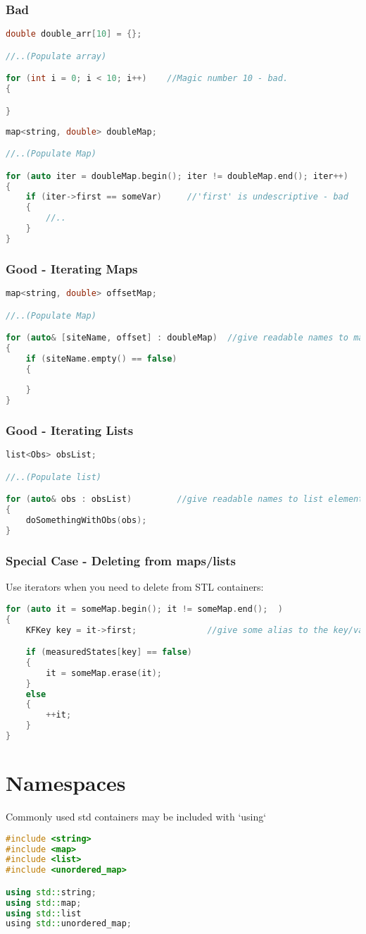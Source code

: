 \subsubsection{Bad}
\begin{lstlisting}[language=c++]
double double_arr[10] = {};

//..(Populate array)

for (int i = 0; i < 10; i++)    //Magic number 10 - bad.
{

}
\end{lstlisting}
%
\begin{lstlisting}[language=c++]
map<string, double> doubleMap;

//..(Populate Map)

for (auto iter = doubleMap.begin(); iter != doubleMap.end(); iter++)   //long, undescriptive - bad
{
   	if (iter->first == someVar)     //'first' is undescriptive - bad
   	{
   		//..
   	}
}
\end{lstlisting}
\subsubsection{Good - Iterating Maps}
\begin{lstlisting}[language=c++]
map<string, double> offsetMap;

//..(Populate Map)

for (auto& [siteName, offset] : doubleMap)	//give readable names to map keys and values
{
    if (siteName.empty() == false)
    {
    
    }
}
\end{lstlisting}
\subsubsection{Good - Iterating Lists}
\begin{lstlisting}[language=c++]
list<Obs> obsList;

//..(Populate list)

for (auto& obs : obsList)         //give readable names to list elements
{
    doSomethingWithObs(obs);
}
\end{lstlisting}

\subsubsection{Special Case - Deleting from maps/lists}

Use iterators when you need to delete from STL containers:
\begin{lstlisting}[language=c++]
for (auto it = someMap.begin(); it != someMap.end();  )
{
    KFKey key = it->first;				//give some alias to the key/value so they're readable

    if (measuredStates[key] == false)
    {
    	it = someMap.erase(it);
   	}
    else
    {
    	++it;
   	}
}
\end{lstlisting}
\section{Namespaces}

Commonly used std containers may be included with `using`
\begin{lstlisting}[language=c++]
#include <string>
#include <map>
#include <list>
#include <unordered_map>

using std::string;
using std::map;
using std::list
using std::unordered_map;
\end{lstlisting}
